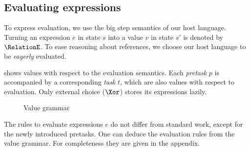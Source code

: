\subsection{Evaluating expressions}
\label{sec:evaluation}

To express evaluation,
we use the big step semantics of our host language.
Turning an expression $e$ in state $s$ into a value $v$ in state $s'$ is denoted by $\RelationE$.
To ease reasoning about references,
we choose our host language to be \emph{eagerly} evaluated.

 shows values with respect to the evaluation semantics.
Each \emph{pretask} $p$ is accompanied by a corresponding \emph{task} $t$,
which are also values with respect to evaluation.
Only external choice ($\Xor$) stores its expressions lazily.

\begin{figure}[h]
  \small
  \caption{Value grammar} \label{fig:value-grammar}
\end{figure}

The rules to evaluate expressions $e$ do not differ from standard work,
except for the newly introduced pretasks.
One can deduce the evaluation rules from the value grammar.
For completeness they are given in the appendix.



